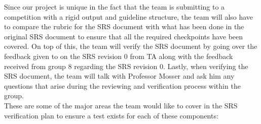 \documentclass[12pt, titlepage]{article}
\begin{document}
  Since our project is unique in the fact that the team is submitting to a competition with a rigid output and guideline structure, the team will also have to compare the rubric for the SRS document with what has been done in the original SRS document to ensure that all the required checkpoints have been covered. On top of this, the team will verify the SRS document by going over the feedback given to on the SRS revision 0 from TA along with the feedback received from group 8 regarding the SRS revision 0. Lastly, when verifying the SRS document, the team will talk with Professor Mosser and ask him any questions that arise during the reviewing and verification process within the group. \\

  These are some of the major areas the team would like to cover in the SRS verification plan to ensure a test exists for each of these components:\\
\end{document}
